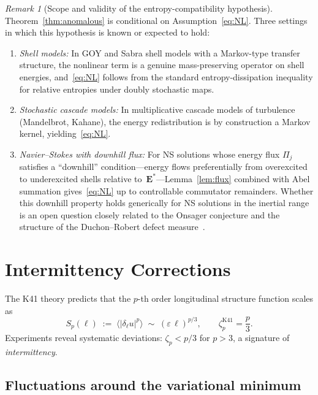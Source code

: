 \documentclass[12pt,a4paper]{article}
\theoremstyle{definition}
\theoremstyle{plain}
\theoremstyle{remark}
\newtheorem{remark}[definition]{Remark}
\begin{document}
\begin{remark}[Scope and validity of the entropy-compatibility hypothesis]
Theorem~\ref{thm:anomalous} is conditional on
Assumption~\eqref{eq:NL}.  Three settings in which this hypothesis
is known or expected to hold:
\begin{enumerate}
\item \emph{Shell models:} In GOY and Sabra shell models with a
  Markov-type transfer structure, the nonlinear term is a genuine
  mass-preserving operator on shell energies, and~\eqref{eq:NL}
  follows from the standard entropy-dissipation inequality for
  relative entropies under doubly stochastic maps.
\item \emph{Stochastic cascade models:} In multiplicative cascade models
  of turbulence (Mandelbrot, Kahane), the energy redistribution is
  by construction a Markov kernel, yielding~\eqref{eq:NL}.
\item \emph{Navier--Stokes with downhill flux:} For NS solutions whose
  energy flux $\Pi_j$ satisfies a ``downhill'' condition---energy flows
  preferentially from overexcited to underexcited shells relative
  to~$\mathbf{E}^*$---Lemma~\ref{lem:flux} combined with Abel
  summation gives~\eqref{eq:NL} up to controllable commutator
  remainders.  Whether this downhill property holds generically for
  NS solutions in the inertial range is an open question closely
  related to the Onsager conjecture and the structure of the
  Duchon--Robert defect measure~\cite{DR00}.
\end{enumerate}
\end{remark}

\section{Intermittency Corrections}\label{sec:intermittency}

The K41 theory predicts that the $p$-th order longitudinal structure
function scales as
\begin{equation}\label{eq:Sp_K41}
  S_p(\ell) \;:=\;
  \bigl\langle |\delta_\ell u|^p \bigr\rangle
  \;\sim\; (\varepsilon\,\ell)^{p/3},
  \qquad
  \zeta_p^{\mathrm{K41}} = \frac{p}{3}.
\end{equation}
Experiments reveal systematic deviations: $\zeta_p < p/3$ for $p > 3$,
a signature of \emph{intermittency}.

\subsection{Fluctuations around the variational minimum}
\end{document}

